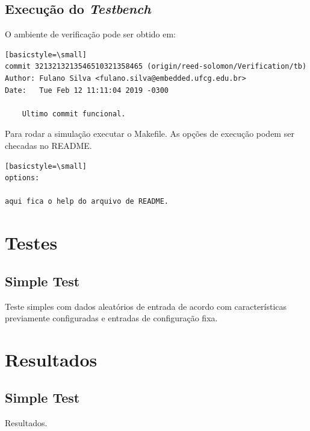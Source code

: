 \documentclass[a4paper]{article}
\begin{document}
\subsection{Execução do \textit{Testbench}}

O ambiente de verificação pode ser obtido em:

\vspace{5pt}

\lstset{language=bash}
\begin{lstlisting}[backgroundcolor=\color{grey}][basicstyle=\small]
commit 3213213213546510321358465 (origin/reed-solomon/Verification/tb)
Author: Fulano Silva <fulano.silva@embedded.ufcg.edu.br>
Date:   Tue Feb 12 11:11:04 2019 -0300

    Ultimo commit funcional.

\end{lstlisting}

\vspace{5pt}

Para rodar a simulação executar o Makefile. As opções de execução podem ser checadas no README.

\vspace{5pt}


\lstset{language=bash}
\begin{lstlisting}[backgroundcolor=\color{grey}][basicstyle=\small]
options:

aqui fica o help do arquivo de README.

\end{lstlisting}

\vspace{5pt}

\pagebreak
\section{Testes}

\subsection{Simple Test}

Teste simples com dados aleatórios de entrada de acordo com características previamente configuradas e entradas de configuração fixa.
 
\pagebreak

\section{Resultados}

\subsection{Simple Test}

Resultados.
\end{document}
